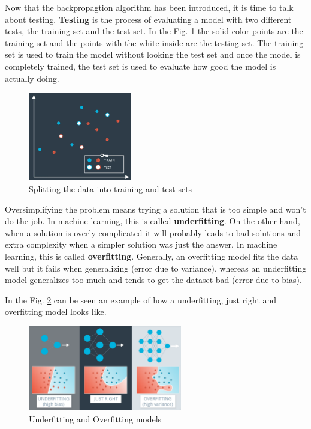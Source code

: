 \documentclass{article}
\begin{document}
Now that the backpropagtion algorithm has been introduced, it is time to talk about testing. \textbf{Testing} is the process of evaluating a model with two different tests, the training set and the test set. In the Fig. \ref{fig:f34} the solid color points are the training set and the points with the white inside are the testing set. The training set is used to train the model without looking the test set and once the model is completely trained, the test set is used to evaluate how good the model is actually doing.

\begin{figure}[ht]
    \centering
    \includegraphics[width=0.4\textwidth,height=0.4\textheight,keepaspectratio]{images/testing.png}
    \captionsetup{justification=centering}
    \caption{Splitting the data into training and test sets}
    \label{fig:f34}
\end{figure}

Oversimplifying the problem means trying a solution that is too simple and won't do the job. In machine learning, this is called \textbf{underfitting}. On the other hand, when a solution is overly complicated it will probably leads to bad solutions and extra complexity when a simpler solution was just the answer. In machine learning, this is called \textbf{overfitting}. Generally, an overfitting model fits the data well but it fails when generalizing (error due to variance), whereas an underfitting model generalizes too much and tends to get the dataset bad (error due to bias).

In the Fig. \ref{fig:f35} can be seen an example of how a underfitting, just right and overfitting model looks like.

\begin{figure}[ht]
    \centering
    \includegraphics[width=0.6\textwidth,height=0.6\textheight,keepaspectratio]{images/under_over.png}
    \captionsetup{justification=centering}
    \caption{Underfitting and Overfitting models}
    \label{fig:f35}
\end{figure}
\end{document}
